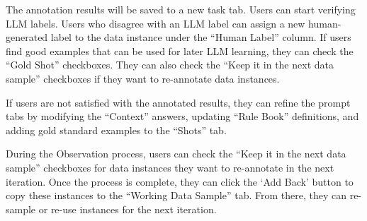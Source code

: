 The annotation results will be saved to a new task tab. Users can start verifying LLM labels. Users who disagree with an LLM label can assign a new human-generated label to the data instance under the ``Human Label'' column. If users find good examples that can be used for later LLM learning, they can check the ``Gold Shot'' checkboxes. They can also check the ``Keep it in the next data sample'' checkboxes if they want to re-annotate data instances.

If users are not satisfied with the annotated results, they can refine the prompt tabs by modifying the ``Context'' answers, updating ``Rule Book'' definitions, and adding gold standard examples to the ``Shots'' tab. 


During the Observation process, users can check the ``Keep it in the next data sample'' checkboxes for data instances they want to re-annotate in the next iteration. Once the process is complete, they can click the ‘Add Back’ button to copy these instances to the ``Working Data Sample'' tab.  
From there, they can re-sample or re-use instances for the next iteration.
